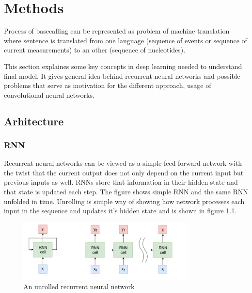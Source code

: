 \documentclass[times, utf8, diplomski, numeric, english]{fer}
\begin{document}
\chapter{Methods}
Process of basecalling can be represented as problem of machine translation where sentence is translated from one language (sequence of events or sequence of current measurements) to an other (sequence of nucleotides). 

This section explaines some key concepts in deep learning needed to understand final model. It gives general idea behind recurrent neural networks and possible problems that serve as motivation for the different approach, usage of convolutional neural networks. 

\section{Arhitecture}

\subsection{RNN}
Recurrent neural networks can be viewed as a simple feed-forward network with the twist that the current output does not only depend on the current input but previous inputs as well. RNNs store that information in their hidden state and that state is updated each step. The figure shows simple RNN and the same RNN unfolded in time.  Unrolling is simple way of showing how network processes each input in the sequence and updates it's hidden state and is shown in figure  \ref{fg:rnn}. 
\begin{figure}[!ht]
	\begin{center}
		\includegraphics[width=0.8\textwidth]{./imgs/rnn.png}
		\caption{An unrolled recurrent neural network}
		\label{fg:rnn}
	\end{center}
\end{figure}
\end{document}
